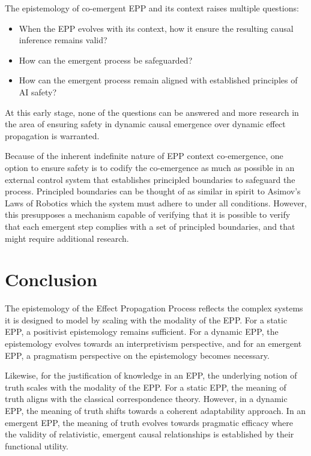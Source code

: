 \documentclass{article}
\begin{document}
The epistemology of co-emergent EPP and its context raises multiple questions:

\begin{itemize}
    \item When the EPP evolves with its context, how it ensure the resulting causal inference remains valid?
    \item How can the emergent process be safeguarded?
    \item How can the emergent process remain aligned with established principles of AI safety?
\end{itemize}

At this early stage, none of the questions can be answered and more research in the area of ensuring safety in dynamic causal emergence over dynamic effect propagation is warranted.

Because of the inherent indefinite nature of EPP context co-emergence, one option to ensure safety is to codify the co-emergence as much as possible in an external control system that establishes principled boundaries to safeguard the process. Principled boundaries can be thought of as similar in spirit to Asimov's Laws of Robotics which the system must adhere to under all conditions. However, this presupposes a mechanism capable of verifying that it is possible to verify that each emergent step complies with a set of principled boundaries, and that might require additional research.

\newpage

\section{Conclusion}
\label{sec:Conclusion}


The epistemology of the Effect Propagation Process reflects the complex systems it is designed to model by scaling with the modality of the EPP. For a static EPP, a positivist epistemology remains sufficient. For a dynamic EPP, the epistemology evolves towards an interpretivism perspective, and for an emergent EPP, a pragmatism perspective on the epistemology becomes necessary.

Likewise, for the justification of knowledge in an EPP, the underlying notion of truth scales with the modality of the EPP. For a static EPP, the meaning of truth aligns with the classical correspondence theory. However, in a dynamic EPP, the meaning of truth shifts towards a coherent adaptability approach. In an emergent EPP, the meaning of truth evolves towards pragmatic efficacy where the validity of relativistic, emergent causal relationships is established by their functional utility.
\end{document}
